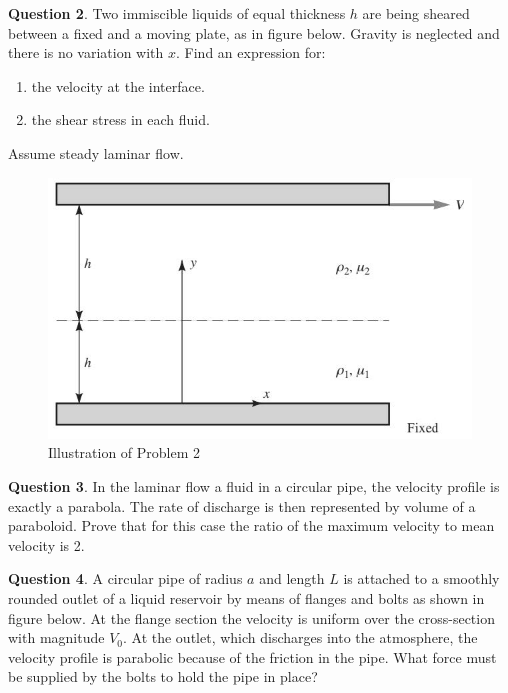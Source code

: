 \documentclass{article}
\begin{document}
\break

\textbf{Question 2}. Two immiscible liquids of equal thickness $h$ are being sheared between a fixed and a moving plate, as in figure below. Gravity is neglected and there is no variation with $x$. Find an expression for:
\begin{enumerate}[label=\arabic*)]
    \item the velocity at the interface.
    \item the shear stress in each fluid.
\end{enumerate}
Assume steady laminar flow.

\begin{figure}[h]
    \centering
    \includegraphics{Problem2.jpg}
    \caption{Illustration of Problem 2}
    \label{fig:figprob2}
\end{figure}

\break

\textbf{Question 3}. In the laminar flow a fluid in a circular pipe, the velocity profile is exactly a parabola. The rate of discharge is then represented by volume of a paraboloid. Prove that for this case the ratio of the maximum velocity to mean velocity is 2.

\break

\textbf{Question 4}. A circular pipe of radius $a$ and length $L$ is attached to a smoothly rounded outlet of a liquid reservoir by means of flanges and bolts as shown in figure below. At the flange section the velocity is uniform over the cross-section with magnitude $V_0$. At the outlet, which discharges into the atmosphere, the velocity profile is parabolic because of the friction in the pipe. What force must be supplied by the bolts to hold the pipe in place?
\end{document}

